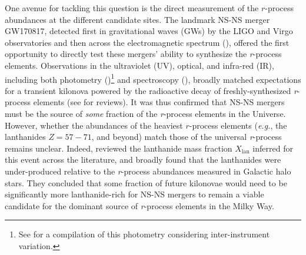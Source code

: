 \documentclass[twocolumn, twocolappendix]{aastex63}
\def\eg{{\it e.g.}}
\begin{document}
One avenue for tackling this question is the direct measurement of the $r$-process abundances at the different candidate sites. The landmark NS-NS merger GW170817, detected first in gravitational waves (GWs) by the LIGO and Virgo observatories and then across the electromagnetic spectrum (\citealt{abbottLIGO17a, abbottLIGO17b}), offered the first opportunity to directly test these mergers' ability to synthesize the \textit{r}-process elements. Observations in the ultraviolet (UV), optical, and infra-red (IR), including both photometry (\citealt{andreoni17, arcavi17, coulter17, diaz17, drout17, evans17, hu17, kasliwal17, lipunov17, tanvir17, troja17, utsumi17, valenti17})\footnote{See \cite{villar17} for a compilation of this photometry considering inter-instrument variation.} and spectroscopy (\citealt{chornock17, kasen17, pian17, shappee17, smartt17, cote18}), broadly matched expectations for a transient kilonova powered by the radioactive decay of freshly-synthesized \textit{r}-process elements (see \citealt{metzger19, margutti21} for reviews). It was thus confirmed that NS-NS mergers must be the source of \textit{some} fraction of the \textit{r}-process elements in the Universe. However, whether the abundances of the heaviest $r$-process elements (\eg, the lanthanides $Z = 57 - 71$, and beyond) match those of the universal \textit{r}-process remains unclear. Indeed, \cite{ji19} reviewed the lanthanide mass fraction $X_{\mathrm{lan}}$ inferred for this event across the literature, and broadly found that the lanthanides were under-produced relative to the \textit{r}-process abundances measured in Galactic halo stars. They concluded that some fraction of future kilonovae would need to be significantly more lanthanide-rich for NS-NS mergers to remain a viable candidate for the dominant source of \textit{r}-process elements in the Milky Way. 
\end{document}
